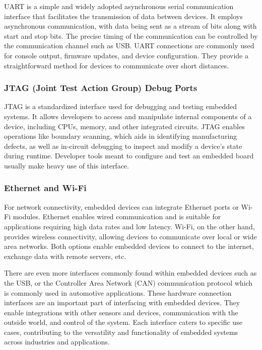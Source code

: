 UART is a simple and widely adopted asynchronous serial communication interface that facilitates the transmission of data between devices. It employs asynchronous communication, with data being sent as a stream of bits along with start and stop bits. The precise timing of the communication can be controlled by the communication channel such as USB. UART connections are commonly used for console output, firmware updates, and device configuration. They provide a straightforward method for devices to communicate over short distances.

\subsubsection{JTAG (Joint Test Action Group) Debug Ports}

JTAG is a standardized interface used for debugging and testing embedded systems. It allows developers to access and manipulate internal components of a device, including CPUs, memory, and other integrated circuits. JTAG enables operations like boundary scanning, which aids in identifying manufacturing defects, as well as in-circuit debugging to inspect and modify a device's state during runtime. Developer tools meant to configure and test an embedded board usually make heavy use of this interface.

\subsubsection{Ethernet and Wi-Fi}

For network connectivity, embedded devices can integrate Ethernet ports or Wi-Fi modules. Ethernet enables wired communication and is suitable for applications requiring high data rates and low latency. Wi-Fi, on the other hand, provides wireless connectivity, allowing devices to communicate over local or wide area networks. Both options enable embedded devices to connect to the internet, exchange data with remote servers, etc.

There are even more interfaces commonly found within embedded devices such as the USB, or the Controller Area Network (CAN) communication protocol which is commonly used in automotive applications. These hardware connection interfaces are an important part of interfacing with embedded devices. They enable integrations with other sensors and devices, communication with the outside world, and control of the system. Each interface caters to specific use cases, contributing to the versatility and functionality of embedded systems across industries and applications.

